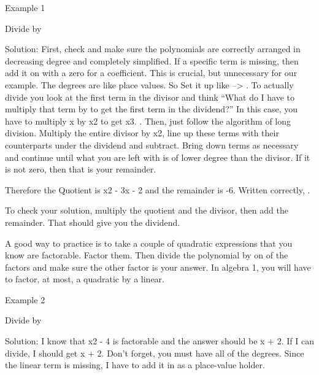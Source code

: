 Example 1

Divide by 

Solution: First, check and make sure the polynomials are correctly arranged in decreasing degree and completely simplified. If a specific term is missing, then add it on with a zero for a coefficient. This is crucial, but unnecessary for our example. The degrees are like place values.
So Set it up like --> . To actually divide you look at the first term in the divisor and think ``What do I have to multiply that term by to get the first term in the dividend?'' In this case, you have to multiply x by x2 to get x3. . Then, just follow the algorithm of long division. Multiply the entire divisor by x2, line up these terms with their counterparts under the dividend and subtract. Bring down terms as necessary and continue until what you are left with is of lower degree than the divisor. If it is not zero, then that is your remainder. 


Therefore the Quotient is x2 - 3x - 2 and the remainder is -6. Written correctly, .

To check your solution, multiply the quotient and the divisor, then add the remainder. That should give you the dividend.


A good way to practice is to take a couple of quadratic expressions that you know are factorable. Factor them. Then divide the polynomial by on of the factors and make sure the other factor is your answer. In algebra 1, you will have to factor, at most, a quadratic by a linear.

Example 2

Divide by 

Solution: I know that x2 - 4 is factorable and the answer should be x + 2. If I can divide, I should get x + 2. Don't forget, you must have all of the degrees. Since the linear term is missing, I have to add it in as a place-value holder.
